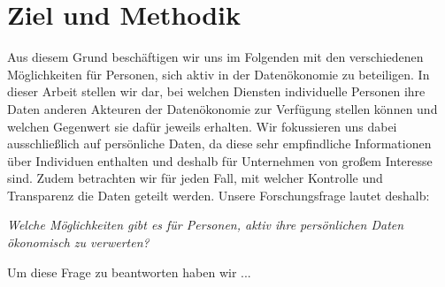 \section{Ziel und Methodik}
Aus diesem Grund beschäftigen wir uns im Folgenden mit den verschiedenen Möglichkeiten für Personen, sich aktiv in der Datenökonomie zu beteiligen. In dieser Arbeit stellen wir dar, bei welchen Diensten individuelle Personen ihre Daten anderen Akteuren der Datenökonomie zur Verfügung stellen können und welchen Gegenwert sie dafür jeweils erhalten. Wir fokussieren uns dabei ausschließlich auf persönliche Daten, da diese sehr empfindliche Informationen über Individuen enthalten und deshalb für Unternehmen von großem Interesse sind. Zudem betrachten wir für jeden Fall, mit welcher Kontrolle und Transparenz die Daten geteilt werden. Unsere Forschungsfrage lautet deshalb:

\begin{center}
\textit{Welche Möglichkeiten gibt es für Personen, aktiv ihre persönlichen Daten ökonomisch zu verwerten?}
\end{center}

\noindent Um diese Frage zu beantworten haben wir ...